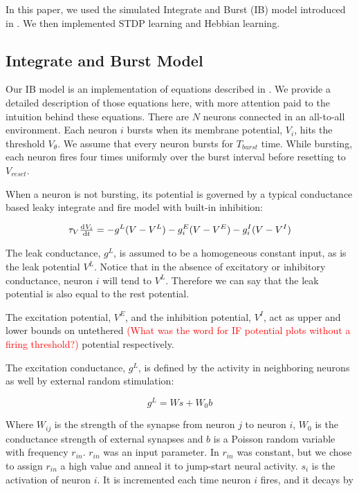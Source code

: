 In this paper, we used the simulated Integrate and Burst (IB) model introduced in \cite{Fiete}. We then implemented STDP learning and Hebbian learning.

\subsection{Integrate and Burst Model}

Our IB model is an implementation of equations described in \cite{Fiete}. We provide a detailed description of those equations here, with more attention paid to the intuition behind these equations. There are \(N\) neurons connected in an all-to-all environment. Each neuron \(i\) bursts when its membrane potential, \(V_i\), hits the threshold \(V_\theta\). We assume that every neuron bursts for \(T_{burst}\) time. While bursting, each neuron fires four times uniformly over the burst interval before resetting to \(V_{reset}\).

When a neuron is not bursting, its potential is governed by a typical conductance based leaky integrate and fire model with built-in inhibition:

\begin{equation}
\tau_V \od{V_i}{t} = -g^L(V - V^L) - g^E_i(V - V^E) - g^I_i(V - V^I)
\label{Potential}
\end{equation}

The leak conductance, \(g^L\), is assumed to be a homogeneous constant input, as is the leak potential \(V^L\). Notice that in the absence of excitatory or inhibitory conductance, neuron \(i\) will tend to \(V^L\). Therefore we can say that the leak potential is also equal to the rest potential.

The excitation potential, \(V^E\), and the inhibition potential, \(V^I\), act as upper and lower bounds on untethered \textcolor{red}{(What was the word for IF potential plots without a firing threshold?)} potential respectively. 

The excitation conductance, \(g^L\), is defined by the activity in neighboring neurons as well by external random stimulation:

\[g^L = Ws + W_0b\]

Where \(W_{ij}\) is the strength of the synapse from neuron \(j\) to neuron \(i\), \(W_0\) is the conductance strength of external synapses and \(b\) is a Poisson random variable with frequency \(r_{in}\). \(r_{in}\) was an input parameter. In \cite{Fiete} \(r_{in}\) was constant, but we chose to assign \(r_{in}\) a high value and anneal it to jump-start neural activity. \(s_i\) is the activation of neuron \(i\). It is incremented each time neuron \(i\) fires, and it decays by


